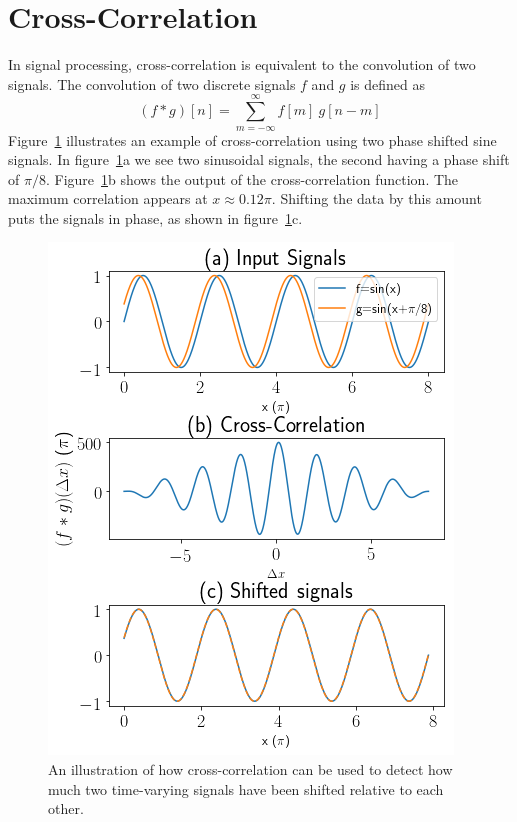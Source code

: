 \documentclass[aps,prstab,reprint,12pt]{revtex4-1}
\begin{document}
\clearpage
\appendix
\section{Cross-Correlation}\label{apx:correlation}
In signal processing, cross-correlation is equivalent to the convolution of two signals. The convolution of two discrete signals $f$ and $g$ is defined as
\begin{equation}
    (f*g)[n] = \sum\limits_{m=-\infty}^\infty f[m]\ g[n-m]
    \label{eq:convolution}
\end{equation}
Figure~\ref{fig:correlation_example} illustrates an example of cross-correlation using two phase shifted sine signals. In figure~\ref{fig:correlation_example}a we see two sinusoidal signals, the second having a phase shift of $\pi/8$. Figure~\ref{fig:correlation_example}b shows the output of the cross-correlation function. The maximum correlation appears at $x\approx0.12\pi$. Shifting the data by this amount puts the signals in phase, as shown in figure~\ref{fig:correlation_example}c. 
\newpage

\begin{figure}[h]
    \centering
    \includegraphics[width=0.9\linewidth]{figs/data/correlation_example.png}
    \caption{An illustration of how cross-correlation can be used to detect how much two time-varying signals have been shifted relative to each other.}
    \label{fig:correlation_example}
\end{figure}
\end{document}
